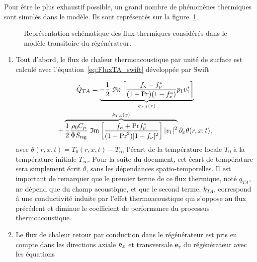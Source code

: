Pour être le plus exhaustif possible, un grand nombre de phénomènes thermiques sont simulés dans le modèle. Ils sont représentés sur la figure~\ref{fig:Schema_FluxThermiquesNoyau_Gaelle}.

\begin{figure}[!ht]
    \centering
    
    \caption{Représentation schématique des flux thermiques considérés dans le modèle transitoire du régénérateur.}
    \label{fig:Schema_FluxThermiquesNoyau_Gaelle}
\end{figure}

\begin{enumerate}[label=\textbf{(\roman*)}]
\item Tout d'abord, le flux de chaleur thermoacoustique par unité de surface est calculé avec l'équation~\eqref{eq:FluxTA_swift} développée par Swift \cite{swift_thermoacoustics_2017}

\begin{multline}
	\dot Q_{TA} = \underbrace{ -\frac12~\mathfrak{Re}\left[ \frac{ f_\kappa-f_\nu^* }{ (1+\mathrm{Pr})(1-f_\nu^*) } p_1 v_1^* \right] }_{q_{TA}(x)} \\ 
	+ \overbrace{ \frac12 \frac{\rho_0 C_p}{\Phi S_{\sf reg}}~\mathfrak{Im}\left[ \frac{f_\kappa + \mathrm{Pr} f_\nu^*}{(1-\mathrm{Pr}^2)|1-f_\nu|^2} \right] |v_1|^2 }^{k_{TA}(x)}\partial_x \theta(r,x;t),
\label{eq:FluxTA_Transitoire_Regen}
\end{multline}
avec $\theta(r,x,t) = T_0(r,x,t)-T_\infty$ l'écart de la température locale $T_0$ à la température initiale $T_\infty$. Pour la suite du document, cet écart de température sera simplement écrit $\theta$, sans les dépendances spatio-temporelles. Il est important de remarquer que le premier terme de ce flux thermique, noté $q_{TA}$, ne dépend que du champ acoustique, et que le second terme, $k_{TA}$, correspond à une conductivité induite par l'effet thermoacoustique qui s'oppose au flux précédent et diminue le coefficient de performance du processus thermoacoustique.

\item Le flux de chaleur retour par conduction dans le régénérateur est pris en compte dans les directions axiale $\textbf e_x$ et transversale $\textbf{e}_r$ du régénérateur avec les équations



\end{enumerate}
